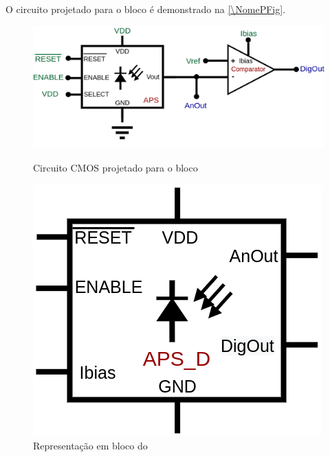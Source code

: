 O circuito projetado para o bloco \'e demonstrado na \autoref{\NomePFig}.

\begin{figure}[htb]
 \centering
    \centering
    \caption{Circuito CMOS projetado para o bloco \NomeBloco} 
    \includegraphics[scale=0.3]{Circuitos/APS_digitalized.png}
    \label{\NomePFig}
\end{figure}

\begin{figure}[htb]
 \centering
    \centering
    \caption{Representa{\c c}\~ao em bloco do \NomeBloco} \label{\NomeSFig}
    \includegraphics[scale=0.3]{Circuitos/APS_digitalized_block.png}
\end{figure}


